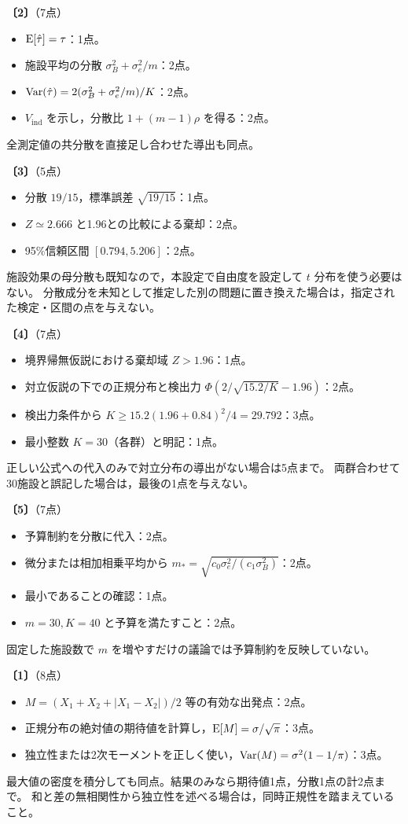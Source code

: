 \documentclass[a4paper,11pt]{ltjsarticle}
\renewcommand{\ans}[1]{\par\medskip\noindent\textbf{〔#1〕}\quad}
\renewcommand{\points}[1]{\hfill\textnormal{（#1点）}\par\nobreak}
\begin{document}
\ans{2}\points{7}
\begin{itemize}
\item $\operatorname{E}[\hat\tau]=\tau$：1点。
\item 施設平均の分散 $\sigma_B^2+\sigma_e^2/m$：2点。
\item $\operatorname{Var}(\hat\tau)=2(\sigma_B^2+\sigma_e^2/m)/K$：2点。
\item $V_{\mathrm{ind}}$ を示し，分散比 $1+(m-1)\rho$ を得る：2点。
\end{itemize}
全測定値の共分散を直接足し合わせた導出も同点。

\ans{3}\points{5}
\begin{itemize}
\item 分散 $19/15$，標準誤差 $\sqrt{19/15}$：1点。
\item $Z\simeq2.666$ と1.96との比較による棄却：2点。
\item 95\%信頼区間 $[0.794,5.206]$：2点。
\end{itemize}
施設効果の母分散も既知なので，本設定で自由度を設定して $t$ 分布を使う必要はない。
分散成分を未知として推定した別の問題に置き換えた場合は，指定された検定・区間の点を与えない。

\ans{4}\points{7}
\begin{itemize}
\item 境界帰無仮説における棄却域 $Z>1.96$：1点。
\item 対立仮説の下での正規分布と検出力 $\Phi(2/\sqrt{15.2/K}-1.96)$：2点。
\item 検出力条件から $K\geq15.2(1.96+0.84)^2/4=29.792$：3点。
\item 最小整数 $K=30$（各群）と明記：1点。
\end{itemize}
正しい公式への代入のみで対立分布の導出がない場合は5点まで。
両群合わせて30施設と誤記した場合は，最後の1点を与えない。

\ans{5}\points{7}
\begin{itemize}
\item 予算制約を分散に代入：2点。
\item 微分または相加相乗平均から $m_*=\sqrt{c_0\sigma_e^2/(c_1\sigma_B^2)}$：2点。
\item 最小であることの確認：1点。
\item $m=30,K=40$ と予算を満たすこと：2点。
\end{itemize}
固定した施設数で $m$ を増やすだけの議論では予算制約を反映していない。
\newpage

\ans{1}\points{8}
\begin{itemize}
\item $M=(X_1+X_2+|X_1-X_2|)/2$ 等の有効な出発点：2点。
\item 正規分布の絶対値の期待値を計算し，$\operatorname{E}[M]=\sigma/\sqrt\pi$：3点。
\item 独立性または2次モーメントを正しく使い，$\operatorname{Var}(M)=\sigma^2(1-1/\pi)$：3点。
\end{itemize}
最大値の密度を積分しても同点。結果のみなら期待値1点，分散1点の計2点まで。
和と差の無相関性から独立性を述べる場合は，同時正規性を踏まえていること。
\end{document}
